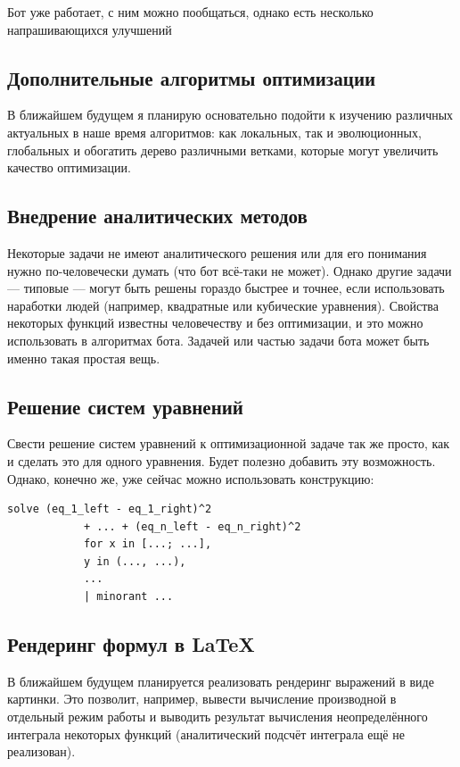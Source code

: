 \documentclass[11pt]{article}
\begin{document}
    Бот уже работает, с ним можно пообщаться, однако есть несколько напрашивающихся улучшений

    \subsection{Дополнительные алгоритмы оптимизации}
    В ближайшем будущем я планирую основательно подойти к изучению различных актуальных в наше время алгоритмов:
    как локальных, так и эволюционных, глобальных и обогатить дерево различными ветками, которые могут увеличить качество оптимизации.

    \subsection{Внедрение аналитических методов}
    Некоторые задачи не имеют аналитического решения или для его понимания нужно по-человечески думать (что бот всё-таки не может).
    Однако другие задачи — типовые — могут быть решены гораздо быстрее и точнее, если использовать наработки людей (например, квадратные или кубические уравнения).
    Свойства некоторых функций известны человечеству и без оптимизации, и это можно использовать в алгоритмах бота.
    Задачей или частью задачи бота может быть именно такая простая вещь.

    \subsection{Решение систем уравнений}
    Свести решение систем уравнений к оптимизационной задаче так же просто, как и сделать это для одного уравнения.
    Будет полезно добавить эту возможность.
    Однако, конечно же, уже сейчас можно использовать конструкцию:

    \begin{lstlisting}[label={lst:equation-system}]
            solve (eq_1_left - eq_1_right)^2
            + ... + (eq_n_left - eq_n_right)^2
            for x in [...; ...],
            y in (..., ...),
            ...
            | minorant ...
    \end{lstlisting}

    \subsection{Рендеринг формул в \LaTeX}
    В ближайшем будущем планируется реализовать рендеринг выражений в виде картинки.
    Это позволит, например, вывести вычисление производной в отдельный режим работы
    и выводить результат вычисления неопределённого интеграла некоторых функций (аналитический подсчёт интеграла ещё не реализован).
\end{document}
